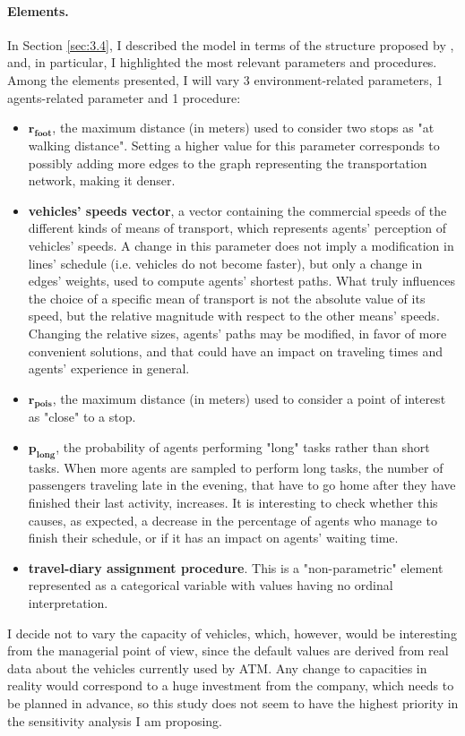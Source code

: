 \paragraph{Elements.}
In Section \ref{sec:3.4}, I described the model in terms of the structure proposed by \textcite{Borgonovo2022SensitivityAO}, and, in particular, I highlighted the most relevant parameters and procedures. Among the elements presented, I will vary 3 environment-related parameters, 1 agents-related parameter and 1 procedure:
\begin{itemize}
    \item $\mathbf{r_{foot}}$, the maximum distance (in meters) used to consider two stops as "at walking distance". Setting a higher value for this parameter corresponds to possibly adding more edges to the graph representing the transportation network, making it denser.
    \item \textbf{vehicles' speeds vector}, a vector containing the commercial speeds of the different kinds of means of transport, which represents agents' perception of vehicles' speeds. A change in this parameter does not imply a modification in lines' schedule (i.e. vehicles do not become faster), but only a change in edges' weights, used to compute agents' shortest paths. What truly influences the choice of a specific mean of transport is not the absolute value of its speed, but the relative magnitude with respect to the other means' speeds. Changing the relative sizes, agents' paths may be modified, in favor of more convenient solutions, and that could have an impact on traveling times and agents' experience in general.
    \item $\mathbf{r_{pois}}$, the maximum distance (in meters) used to consider a point of interest as "close" to a stop. 
    \item $\mathbf{p_{long}}$, the probability of agents performing "long" tasks rather than short tasks. When more agents are sampled to perform long tasks, the number of passengers traveling late in the evening, that have to go home after they have finished their last activity, increases. It is interesting to check whether this causes, as expected, a decrease in the percentage of agents who manage to finish their schedule, or if it has an impact on agents' waiting time.
    \item \textbf{travel-diary assignment procedure}. This is a "non-parametric" element represented as a categorical variable with values having no ordinal interpretation.
\end{itemize}
I decide not to vary the capacity of vehicles, which, however, would be interesting from the managerial point of view, since the default values are derived from real data about the vehicles currently used by ATM. Any change to capacities in reality would correspond to a huge investment from the company, which needs to be planned in advance, so this study does not seem to have the highest priority in the sensitivity analysis I am proposing.


